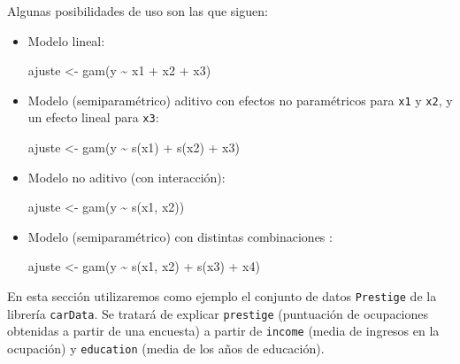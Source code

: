 \documentclass[
]{book}
\newenvironment{Shaded}{\begin{snugshade}}{\end{snugshade}}
\newcommand{\FunctionTok}[1]{\textcolor[rgb]{0.00,0.00,0.00}{#1}}
\newcommand{\NormalTok}[1]{#1}
\newcommand{\OtherTok}[1]{\textcolor[rgb]{0.56,0.35,0.01}{#1}}
\newcommand{\SpecialCharTok}[1]{\textcolor[rgb]{0.00,0.00,0.00}{#1}}
\theoremstyle{break}
\theoremstyle{nonumberplain}
\begin{document}
Algunas posibilidades de uso son las que siguen:

\begin{itemize}
\item
  Modelo lineal:

\begin{Shaded}
\begin{Highlighting}[]
\NormalTok{ajuste }\OtherTok{\textless{}{-}} \FunctionTok{gam}\NormalTok{(y }\SpecialCharTok{\textasciitilde{}}\NormalTok{ x1 }\SpecialCharTok{+}\NormalTok{ x2 }\SpecialCharTok{+}\NormalTok{ x3)}
\end{Highlighting}
\end{Shaded}
\item
  Modelo (semiparamétrico) aditivo con efectos no paramétricos para \texttt{x1} y \texttt{x2}, y un efecto lineal para \texttt{x3}:

\begin{Shaded}
\begin{Highlighting}[]
\NormalTok{ajuste }\OtherTok{\textless{}{-}} \FunctionTok{gam}\NormalTok{(y }\SpecialCharTok{\textasciitilde{}} \FunctionTok{s}\NormalTok{(x1) }\SpecialCharTok{+} \FunctionTok{s}\NormalTok{(x2) }\SpecialCharTok{+}\NormalTok{ x3)}
\end{Highlighting}
\end{Shaded}
\item
  Modelo no aditivo (con interacción):

\begin{Shaded}
\begin{Highlighting}[]
\NormalTok{ajuste }\OtherTok{\textless{}{-}} \FunctionTok{gam}\NormalTok{(y }\SpecialCharTok{\textasciitilde{}} \FunctionTok{s}\NormalTok{(x1, x2))}
\end{Highlighting}
\end{Shaded}
\item
  Modelo (semiparamétrico) con distintas combinaciones :

\begin{Shaded}
\begin{Highlighting}[]
\NormalTok{ajuste }\OtherTok{\textless{}{-}} \FunctionTok{gam}\NormalTok{(y }\SpecialCharTok{\textasciitilde{}} \FunctionTok{s}\NormalTok{(x1, x2) }\SpecialCharTok{+} \FunctionTok{s}\NormalTok{(x3) }\SpecialCharTok{+}\NormalTok{ x4)}
\end{Highlighting}
\end{Shaded}
\end{itemize}

En esta sección utilizaremos como ejemplo el conjunto de datos \texttt{Prestige} de la librería \texttt{carData}.
Se tratará de explicar \texttt{prestige} (puntuación de ocupaciones obtenidas a partir de una encuesta) a partir de \texttt{income} (media de ingresos en la ocupación) y \texttt{education} (media de los años de educación).
\end{document}
